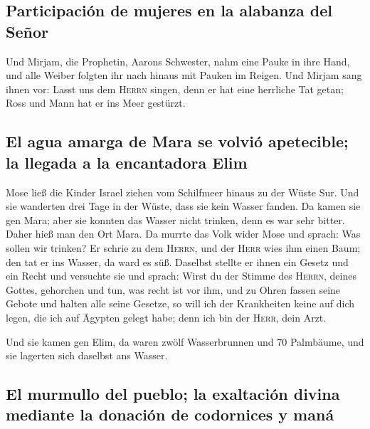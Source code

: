 \hypertarget{participaciuxf3n-de-mujeres-en-la-alabanza-del-seuxf1or}{%
\subsection{Participación de mujeres en la alabanza del
Señor}\label{participaciuxf3n-de-mujeres-en-la-alabanza-del-seuxf1or}}

 Und Mirjam, die Prophetin, Aarons Schwester, nahm eine
Pauke in ihre Hand, und alle Weiber folgten ihr nach hinaus mit Pauken
im Reigen.  Und Mirjam sang ihnen vor: Lasst uns dem
\textsc{Herrn} singen, denn er hat eine herrliche Tat getan; Ross und
Mann hat er ins Meer gestürzt.

\hypertarget{el-agua-amarga-de-mara-se-volviuxf3-apetecible-la-llegada-a-la-encantadora-elim}{%
\subsection{El agua amarga de Mara se volvió apetecible; la llegada a la
encantadora
Elim}\label{el-agua-amarga-de-mara-se-volviuxf3-apetecible-la-llegada-a-la-encantadora-elim}}

 Mose ließ die Kinder Israel ziehen vom Schilfmeer hinaus
zu der Wüste Sur. Und sie wanderten drei Tage in der Wüste, dass sie
kein Wasser fanden.  Da kamen sie gen Mara; aber sie
konnten das Wasser nicht trinken, denn es war sehr bitter. Daher hieß
man den Ort Mara.  Da murrte das Volk wider Mose und
sprach: Was sollen wir trinken?  Er schrie zu dem
\textsc{Herrn}, und der \textsc{Herr} wies ihm einen Baum; den tat er
ins Wasser, da ward es süß. Daselbst stellte er ihnen ein Gesetz und ein
Recht und versuchte sie  und sprach: Wirst du der Stimme
des \textsc{Herrn}, deines Gottes, gehorchen und tun, was recht ist vor
ihm, und zu Ohren fassen seine Gebote und halten alle seine Gesetze, so
will ich der Krankheiten keine auf dich legen, die ich auf Ägypten
gelegt habe; denn ich bin der \textsc{Herr}, dein Arzt.

 Und sie kamen gen Elim, da waren zwölf Wasserbrunnen und
70 Palmbäume, und sie lagerten sich daselbst ans Wasser.

\hypertarget{el-murmullo-del-pueblo-la-exaltaciuxf3n-divina-mediante-la-donaciuxf3n-de-codornices-y-manuxe1}{%
\subsection{El murmullo del pueblo; la exaltación divina mediante la
donación de codornices y
maná}\label{el-murmullo-del-pueblo-la-exaltaciuxf3n-divina-mediante-la-donaciuxf3n-de-codornices-y-manuxe1}}

